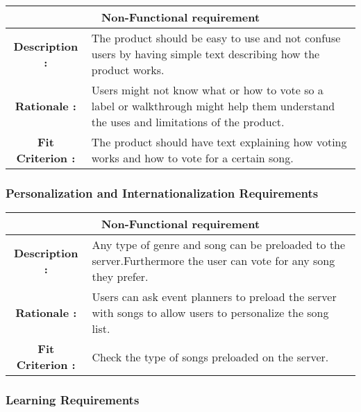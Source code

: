 \documentclass[12pt, titlepage]{article}
\begin{document}
\begin{center}
\begin{table}[H]
\begin{tabularx}{\textwidth}{| c X |}
\hline
\multicolumn{2}{|c|}{\textbf{Non-Functional requirement}}\\
\hline
\textbf{Description : } & The product should be easy to use and not confuse users by having simple text describing how the product works.\\
\hline
\textbf{Rationale : } & Users might not know what or how to vote so a label or walkthrough might help them understand the uses and limitations of the product.\\
\hline
\textbf{Fit Criterion : } &  The product should have text explaining how voting works and how to vote for a certain song.\\
\hline
\end{tabularx}
\end{table}
\end{center}

\subsubsection{Personalization and Internationalization Requirements}

\begin{center}
\begin{table}[H]
\begin{tabularx}{\textwidth}{| c X |}
\hline
\multicolumn{2}{|c|}{\textbf{Non-Functional requirement}}\\
\hline
\textbf{Description : } & Any type of genre and song can be preloaded to the server.Furthermore the user can vote for any song they prefer.\\
\hline
\textbf{Rationale : } &  Users can ask event planners to preload the server with songs to allow users to personalize the song list.\\
\hline
\textbf{Fit Criterion : } &   Check the type of songs preloaded on the server.\\
\hline
\end{tabularx}
\end{table}
\end{center}

\subsubsection{Learning Requirements}
\end{document}
